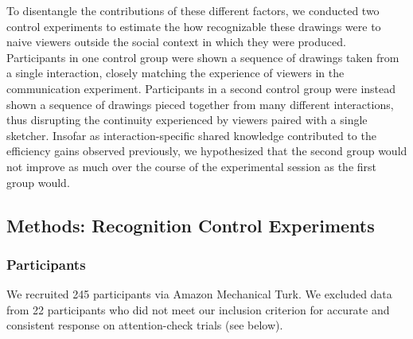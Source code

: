 To disentangle the contributions of these different factors, we conducted two control experiments to estimate the how recognizable these drawings were to naive viewers outside the social context in which they were produced.
Participants in one control group were shown a sequence of drawings taken from a single interaction, closely matching the experience of viewers in the communication experiment.
Participants in a second control group were instead shown a sequence of drawings pieced together from many different interactions, thus disrupting the continuity experienced by viewers paired with a single sketcher.
Insofar as interaction-specific shared knowledge contributed to the efficiency gains observed previously, we hypothesized that the second group would not improve as much over the course of the experimental session as the first group would.


\subsection{Methods: Recognition Control Experiments}

\subsubsection{Participants}

We recruited 245 participants via Amazon Mechanical Turk.
We excluded data from 22 participants who did not meet our inclusion criterion for accurate and consistent response on attention-check trials (see below).

